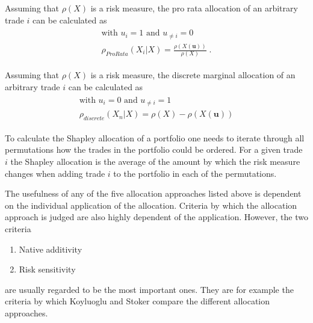 \documentclass[../Thesis_AHoecherl.tex]{subfiles}
\begin{document}
\begin{definition}
    Assuming that $\rho\left(X\right)$ is a risk measure, the pro rata allocation of an arbitrary trade $i$ can be calculated as
    \begin{gather}
        \begin{split}
            \text{with } u_{i} = 1 \text{ and } u_{\neq i} = 0\\
            \rho_{ProRata}\left(X_i|X\right) = \frac{\rho(X(\mathbf{u}))}{\rho(X)} \; \text{.}
        \end{split}
    \end{gather}
\end{definition}

\begin{definition} 
    Assuming that $\rho(X)$ is a risk measure, the discrete marginal allocation of an arbitrary trade $i$ can be calculated as
    \begin{gather}
        \begin{split}
            \text{with } u_{i} = 0 \text{ and } u_{\neq i} = 1\\
            \rho_{discrete}\left(X_n|X\right) = \rho\left(X\right) - \rho\left(X\left(\mathbf{u}\right)\right)    
        \end{split}
    \end{gather}
\end{definition}

\begin{definition}
To calculate the Shapley allocation of a portfolio one needs to iterate through all permutations how the trades in the portfolio could be ordered.
For a given trade $i$ the Shapley allocation is the average of the amount by which the risk measure changes when adding trade $i$ to the portfolio in each of the permutations.
\end{definition}

The usefulness of any of the five allocation approaches listed above is dependent on the individual application of the allocation. Criteria by which the allocation approach is judged are also highly dependent of the application. However, the two criteria
\begin{enumerate}
    \item Native additivity
    \item Risk sensitivity
\end{enumerate}
are usually regarded to be the most important ones. They are for example the criteria by which Koyluoglu and Stoker \cite{koyluoglu2002risk} compare the different allocation approaches.
\end{document}

